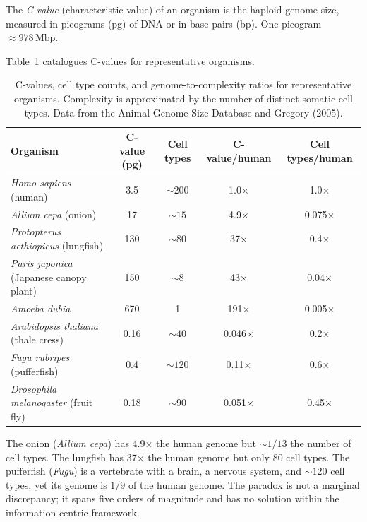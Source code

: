 \begin{definition}[C-value]
\label{def:cvalue}
The \emph{C-value} (characteristic value) of an organism is the haploid
genome size, measured in picograms (pg) of DNA or in base pairs (bp).
One picogram $\approx 978\,\mathrm{Mbp}$.
\end{definition}

Table~\ref{tab:cvalue_examples} catalogues C-values for representative organisms.

\begin{table}[htbp]
\centering
\caption{C-values, cell type counts, and genome-to-complexity ratios for
representative organisms. Complexity is approximated by the number of
distinct somatic cell types. Data from the Animal Genome Size Database
and Gregory (2005).}
\label{tab:cvalue_examples}
\small
\begin{tabular}{lcccc}
\toprule
Organism & C-value (pg) & Cell types & C-value/human & Cell types/human \\
\midrule
\textit{Homo sapiens} (human)          & 3.5  & $\sim 200$ & 1.0$\times$ & 1.0$\times$ \\
\textit{Allium cepa} (onion)           & 17   & $\sim 15$  & 4.9$\times$ & 0.075$\times$ \\
\textit{Protopterus aethiopicus} (lungfish) & 130 & $\sim 80$  & 37$\times$  & 0.4$\times$ \\
\textit{Paris japonica} (Japanese canopy plant) & 150 & $\sim 8$  & 43$\times$ & 0.04$\times$ \\
\textit{Amoeba dubia}                  & 670  & 1          & 191$\times$ & 0.005$\times$ \\
\textit{Arabidopsis thaliana} (thale cress) & 0.16 & $\sim 40$ & 0.046$\times$ & 0.2$\times$ \\
\textit{Fugu rubripes} (pufferfish)    & 0.4  & $\sim 120$ & 0.11$\times$ & 0.6$\times$ \\
\textit{Drosophila melanogaster} (fruit fly) & 0.18 & $\sim 90$ & 0.051$\times$ & 0.45$\times$ \\
\bottomrule
\end{tabular}
\end{table}

\begin{remark}
The onion (\textit{Allium cepa}) has 4.9$\times$ the human genome but
$\sim 1/13$ the number of cell types. The lungfish has 37$\times$ the
human genome but only 80 cell types. The pufferfish (\textit{Fugu})
is a vertebrate with a brain, a nervous system, and $\sim 120$ cell
types, yet its genome is $1/9$ of the human genome. The paradox is
not a marginal discrepancy; it spans five orders of magnitude and
has no solution within the information-centric framework.
\end{remark}

